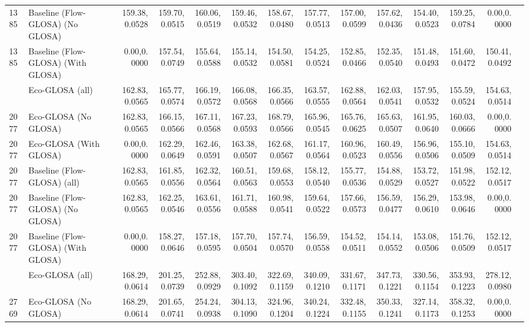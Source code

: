 \begin{table}[ht]
{\begin{tabular}{llrrrrrrrrrrrr}
      1385 & Baseline (Flow-GLOSA) (No GLOSA)  & 159.38,0.0528 & 159.70,0.0515 & 160.06,0.0519 & 159.46,0.0532 & 158.67,0.0480 & 157.77,0.0513 & 157.00,0.0599 & 157.62,0.0436 & 154.40,0.0523 & 159.25,0.0784 &   0.00,0.0000 \\
      1385 & Baseline (Flow-GLOSA) (With GLOSA)&   0.00,0.0000 & 157.54,0.0749 & 155.64,0.0588 & 155.14,0.0532 & 154.50,0.0581 & 154.25,0.0524 & 152.85,0.0466 & 152.35,0.0540 & 151.48,0.0493 & 151.60,0.0472 & 150.41,0.0492 \\
      \addlinespace
      2077 & Eco-GLOSA (all)                   & 162.83,0.0565 & 165.77,0.0574 & 166.19,0.0572 & 166.08,0.0568 & 166.35,0.0566 & 163.57,0.0555 & 162.88,0.0564 & 162.03,0.0541 & 157.95,0.0532 & 155.59,0.0524 & 154.63,0.0514 \\
      2077 & Eco-GLOSA (No GLOSA)              & 162.83,0.0565 & 166.15,0.0566 & 167.11,0.0568 & 167.23,0.0593 & 168.79,0.0566 & 165.96,0.0545 & 165.76,0.0625 & 165.63,0.0507 & 161.95,0.0640 & 160.03,0.0666 &   0.00,0.0000 \\
      2077 & Eco-GLOSA (With GLOSA)            &   0.00,0.0000 & 162.29,0.0649 & 162.46,0.0591 & 163.38,0.0507 & 162.68,0.0567 & 161.17,0.0564 & 160.96,0.0523 & 160.49,0.0556 & 156.96,0.0506 & 155.10,0.0509 & 154.63,0.0514 \\
      2077 & Baseline (Flow-GLOSA) (all)       & 162.83,0.0565 & 161.85,0.0556 & 162.32,0.0564 & 160.51,0.0563 & 159.68,0.0553 & 158.12,0.0540 & 155.77,0.0536 & 154.88,0.0529 & 153.72,0.0527 & 151.98,0.0522 & 152.12,0.0517 \\
      2077 & Baseline (Flow-GLOSA) (No GLOSA)  & 162.83,0.0565 & 162.25,0.0546 & 163.61,0.0556 & 161.71,0.0588 & 160.98,0.0541 & 159.64,0.0522 & 157.66,0.0573 & 156.59,0.0477 & 156.29,0.0610 & 153.98,0.0646 &   0.00,0.0000 \\
      2077 & Baseline (Flow-GLOSA) (With GLOSA)&   0.00,0.0000 & 158.27,0.0646 & 157.18,0.0595 & 157.70,0.0504 & 157.74,0.0570 & 156.59,0.0558 & 154.52,0.0511 & 154.14,0.0552 & 153.08,0.0506 & 151.76,0.0509 & 152.12,0.0517 \\
      \addlinespace
      2769 & Eco-GLOSA (all)                   & 168.29,0.0614 & 201.25,0.0739 & 252.88,0.0929 & 303.40,0.1092 & 322.69,0.1159 & 340.09,0.1210 & 331.67,0.1171 & 347.73,0.1221 & 330.56,0.1154 & 353.93,0.1223 & 278.12,0.0980 \\
      2769 & Eco-GLOSA (No GLOSA)              & 168.29,0.0614 & 201.65,0.0741 & 254.24,0.0938 & 304.13,0.1090 & 324.96,0.1204 & 340.24,0.1224 & 332.48,0.1155 & 350.33,0.1241 & 327.14,0.1173 & 358.32,0.1253 &   0.00,0.0000 \\

\end{tabular}}
\end{table}

